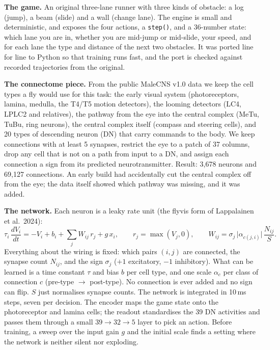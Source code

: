 \documentclass[10pt,a4paper]{article}
\begin{document}
\textbf{The game.} An original three-lane runner with three kinds of obstacle: a log (jump), a beam (slide) and a
wall (change lane). The engine is small and deterministic, and exposes the four actions, a \texttt{step()}, and a
36-number state: which lane you are in, whether you are mid-jump or mid-slide, your speed, and for each lane the
type and distance of the next two obstacles. It was ported line for line to Python so that training runs fast,
and the port is checked against recorded trajectories from the original.

\textbf{The connectome piece.} From the public MaleCNS v1.0 data we keep the cell types a fly would use for this
task: the early visual system (photoreceptors, lamina, medulla, the T4/T5 motion detectors), the looming
detectors (LC4, LPLC2 and relatives), the pathway from the eye into the central complex (MeTu, TuBu, ring
neurons), the central complex itself (compass and steering cells), and 20 types of descending neuron (DN) that
carry commands to the body. We keep connections with at least 5 synapses, restrict the eye to a patch of 37
columns, drop any cell that is not on a path from input to a DN, and assign each connection a sign from its
predicted neurotransmitter. Result: 3{,}678 neurons and 69{,}127 connections. An early build had accidentally cut
the central complex off from the eye; the data itself showed which pathway was missing, and it was added.

\textbf{The network.} Each neuron is a leaky rate unit (the flyvis form of Lappalainen et al.\ 2024):
\begin{equation}
\tau_i\,\frac{dV_i}{dt} = -V_i + b_i + \sum_j W_{ij}\,r_j + g\,x_i,\qquad r_j=\max(V_j,0),\qquad
W_{ij} = \sigma_j\,\bigl|\alpha_{c(j,i)}\bigr|\,\frac{N_{ij}}{S}.
\end{equation}
Everything about the wiring is fixed: which pairs $(i,j)$ are connected, the synapse count $N_{ij}$, and the sign
$\sigma_j$ ($+1$ excitatory, $-1$ inhibitory). What can be learned is a time constant $\tau$ and bias $b$ per cell
type, and one scale $\alpha_c$ per class of connection $c$ (pre-type $\to$ post-type). No connection is ever
added and no sign can flip. $S$ just normalises synapse counts. The network is integrated in 10\,ms steps, seven
per decision. The encoder maps the game state onto the photoreceptor and lamina cells; the readout standardises the
39 DN activities and passes them through a small $39{\to}32{\to}5$ layer to pick an action. Before training, a sweep
over the input gain $g$ and the initial scale finds a setting where the network is neither silent nor exploding.
\end{document}
